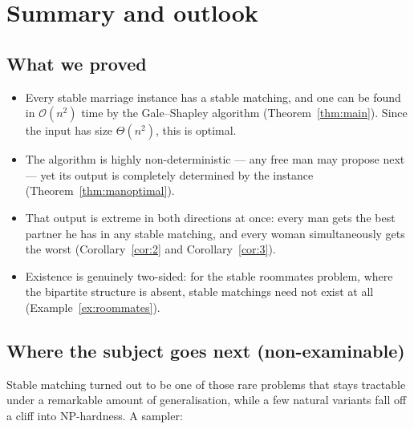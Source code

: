 \documentclass[11pt,a4paper]{article}
\theoremstyle{plain}
\theoremstyle{definition}
\theoremstyle{remark}
\newcommand{\bigoh}[1]{\mathcal{O}\!\left(#1\right)}
\begin{document}
\section{Summary and outlook}\label{sec:outlook}

\subsection*{What we proved}

\begin{itemize}
  \item Every stable marriage instance has a stable matching, and one can be
        found in $\bigoh{n^2}$ time by the Gale--Shapley algorithm
        (Theorem~\ref{thm:main}). Since the input has size $\Theta(n^2)$, this
        is optimal.
  \item The algorithm is highly non-deterministic --- any free man may propose
        next --- yet its output is completely determined by the instance
        (Theorem~\ref{thm:manoptimal}).
  \item That output is extreme in both directions at once: every man gets the
        best partner he has in any stable matching, and every woman
        simultaneously gets the worst (Corollary~\ref{cor:2} and
        Corollary~\ref{cor:3}).
  \item Existence is genuinely two-sided: for the stable roommates problem,
        where the bipartite structure is absent, stable matchings need not
        exist at all (Example~\ref{ex:roommates}).
\end{itemize}

\subsection*{Where the subject goes next (non-examinable)}

Stable matching turned out to be one of those rare problems that stays
tractable under a remarkable amount of generalisation, while a few natural
variants fall off a cliff into NP-hardness. A sampler:
\end{document}
